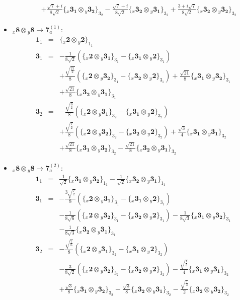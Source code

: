 \documentclass[english]{article}
\newcommand{\rep}[1]{\mathbf{#1}}
\newcommand{\repx}[2]{{}_{#2}\mathbf{#1}}
\newcommand{\subcg}[3]{\big\{ \repx{#1}{x}\otimes\repx{#2}{y}\big\}^{}_{#3}}
\begin{document}
\begin{itemize}
\begin{eqnarray*}
 & & +\frac{\sqrt{7}+i}{8 \sqrt{2}}\subcg{3_{1}}{3_{2}}{3_{2}}-\frac{\sqrt{7}+i}{8 \sqrt{2}}\subcg{3_{2}}{3_{1}}{3_{2}}+\frac{3+i \sqrt{7}}{8 \sqrt{2}}\subcg{3_{2}}{3_{2}}{3_{2}}
\end{eqnarray*}
\item $\repx{8}{x}\otimes\repx{8}{y}\to\rep{7}_{a}^{(1)}$:
\begin{eqnarray*}
\rep{1}_{1} &=& \subcg{2}{2}{1_{1}}
\\
\rep{3}_{1} &=& -\frac{1}{8 \sqrt{2}}\left(\subcg{2}{3_{1}}{3_{1}}-\subcg{3_{1}}{2}{3_{1}}\right) \\ 
 & & +\frac{\sqrt{\frac{21}{2}}}{8}\left(\subcg{2}{3_{2}}{3_{1}}-\subcg{3_{2}}{2}{3_{1}}\right)+\frac{\sqrt{21}}{8}\subcg{3_{1}}{3_{2}}{3_{1}} \\ 
 & & +\frac{\sqrt{21}}{8}\subcg{3_{2}}{3_{1}}{3_{1}}
\\
\rep{3}_{2} &=& -\frac{\sqrt{\frac{3}{2}}}{8}\left(\subcg{2}{3_{1}}{3_{2}}-\subcg{3_{1}}{2}{3_{2}}\right) \\ 
 & & +\frac{\sqrt{\frac{7}{2}}}{8}\left(\subcg{2}{3_{2}}{3_{2}}-\subcg{3_{2}}{2}{3_{2}}\right)+\frac{\sqrt{3}}{4}\subcg{3_{1}}{3_{1}}{3_{2}} \\ 
 & & +\frac{\sqrt{21}}{8}\subcg{3_{1}}{3_{2}}{3_{2}}-\frac{\sqrt{21}}{8}\subcg{3_{2}}{3_{1}}{3_{2}}
\end{eqnarray*}
\item $\repx{8}{x}\otimes\repx{8}{y}\to\rep{7}_{a}^{(2)}$:
\begin{eqnarray*}
\rep{1}_{1} &=& \frac{1}{\sqrt{2}}\subcg{3_{1}}{3_{2}}{1_{1}}-\frac{1}{\sqrt{2}}\subcg{3_{2}}{3_{1}}{1_{1}}
\\
\rep{3}_{1} &=& -\frac{3 \sqrt{\frac{7}{2}}}{8}\left(\subcg{2}{3_{1}}{3_{1}}-\subcg{3_{1}}{2}{3_{1}}\right) \\ 
 & & -\frac{1}{8 \sqrt{6}}\left(\subcg{2}{3_{2}}{3_{1}}-\subcg{3_{2}}{2}{3_{1}}\right)-\frac{1}{8 \sqrt{3}}\subcg{3_{1}}{3_{2}}{3_{1}} \\ 
 & & -\frac{1}{8 \sqrt{3}}\subcg{3_{2}}{3_{1}}{3_{1}}
\\
\rep{3}_{2} &=& -\frac{\sqrt{\frac{7}{6}}}{8}\left(\subcg{2}{3_{1}}{3_{2}}-\subcg{3_{1}}{2}{3_{2}}\right) \\ 
 & & -\frac{3}{8 \sqrt{2}}\left(\subcg{2}{3_{2}}{3_{2}}-\subcg{3_{2}}{2}{3_{2}}\right)-\frac{\sqrt{\frac{7}{3}}}{4}\subcg{3_{1}}{3_{1}}{3_{2}} \\ 
 & & +\frac{\sqrt{3}}{8}\subcg{3_{1}}{3_{2}}{3_{2}}-\frac{\sqrt{3}}{8}\subcg{3_{2}}{3_{1}}{3_{2}}-\frac{\sqrt{\frac{7}{3}}}{2}\subcg{3_{2}}{3_{2}}{3_{2}}

\end{eqnarray*}
\end{itemize}
\end{document}

